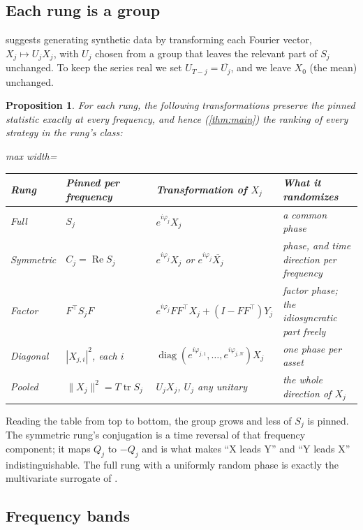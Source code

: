 \documentclass[11pt]{article}
\newtheorem{proposition}[theorem]{Proposition}
\theoremstyle{definition}
\theoremstyle{remark}
\newcommand{\tr}{\operatorname{tr}}
\newcommand{\diag}{\operatorname{diag}}
\DeclareMathOperator{\Real}{Re}
\begin{document}
\subsection{Each rung is a group}

 suggests generating synthetic data by transforming each Fourier vector, $X_j\mapsto U_jX_j$, with $U_j$ chosen from a group that leaves the
relevant part of $S_j$ unchanged. To keep the series real we set $U_{T-j}=\overline{U_j}$, and we leave $X_0$ (the mean) unchanged.

\begin{proposition}\label{prop:groups}
For each rung, the following transformations preserve the pinned statistic exactly at every frequency, and hence (\cref{thm:main}) the ranking of
every strategy in the rung's class:
\begin{center}\small
\begin{adjustbox}{max width=\textwidth}
\begin{tabular}{llll}
\toprule
Rung & Pinned per frequency & Transformation of $X_j$ & What it randomizes \\
\midrule
Full & $S_j$ & $e^{i\varphi_j}X_j$ & a common phase \\
Symmetric & $C_j=\Real S_j$ & $e^{i\varphi_j}X_j$ or $e^{i\varphi_j}\overline{X_j}$ & phase, and time direction per frequency \\
Factor & $F^\top S_jF$ & $e^{i\varphi_j}FF^\top X_j + (I-FF^\top)Y_j$ & factor phase; the idiosyncratic part freely \\
Diagonal & $|X_{j,i}|^2$, each $i$ & $\diag(e^{i\varphi_{j,1}},\dots,e^{i\varphi_{j,N}})X_j$ & one phase per asset \\
Pooled & $\|X_j\|^2=T\tr S_j$ & $U_jX_j$, $U_j$ any unitary & the whole direction of $X_j$ \\
\bottomrule
\end{tabular}
\end{adjustbox}
\end{center}
\end{proposition}

Reading the table from top to bottom, the group grows and less of $S_j$ is pinned. The symmetric rung's conjugation is a time reversal of that frequency
component; it maps $Q_j$ to $-Q_j$ and is what makes ``X leads Y'' and ``Y leads X'' indistinguishable. The full rung with a uniformly random phase is
exactly the multivariate surrogate of \citet{prichard1994}.

\subsection{Frequency bands}
\label{sec:bands}
\end{document}
